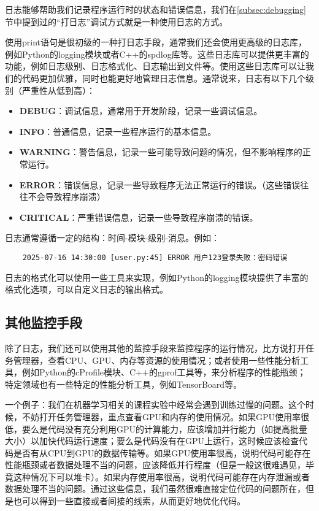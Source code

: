 \documentclass[../main.tex]{subfiles}
\begin{document}
日志能够帮助我们记录程序运行时的状态和错误信息，我们在\ref{subsec:debugging}节中提到过的“打日志”调试方式就是一种使用日志的方式。

使用print语句是很初级的一种打日志手段，通常我们还会使用更高级的日志库，例如Python的logging模块或者C++的spdlog库等。这些日志库可以提供更丰富的功能，例如日志级别、日志格式化、日志输出到文件等。使用这些日志库可以让我们的代码更加优雅，同时也能更好地管理日志信息。通常说来，日志有以下几个级别（严重性从低到高）：
\begin{itemize}
  \item \textbf{DEBUG}：调试信息，通常用于开发阶段，记录一些调试信息。
  \item \textbf{INFO}：普通信息，记录一些程序运行的基本信息。
  \item \textbf{WARNING}：警告信息，记录一些可能导致问题的情况，但不影响程序的正常运行。
  \item \textbf{ERROR}：错误信息，记录一些导致程序无法正常运行的错误。（这些错误往往不会导致程序崩溃）
  \item \textbf{CRITICAL}：严重错误信息，记录一些导致程序崩溃的错误。
\end{itemize}

日志通常遵循一定的结构：时间-模块-级别-消息。例如：
\begin{verbatim}
    2025-07-16 14:30:00 [user.py:45] ERROR 用户123登录失败：密码错误
\end{verbatim}

日志的格式化可以使用一些工具来实现，例如Python的logging模块提供了丰富的格式化选项，可以自定义日志的输出格式。

\subsection{其他监控手段}\label{subsec:other-monitoring}

除了日志，我们还可以使用其他的监控手段来监控程序的运行情况，比方说打开任务管理器，查看CPU、GPU、内存等资源的使用情况；或者使用一些性能分析工具，例如Python的cProfile模块、C++的gprof工具等，来分析程序的性能瓶颈；特定领域也有一些特定的性能分析工具，例如TensorBoard等。

一个例子：我们在机器学习相关的课程实验中经常会遇到训练过慢的问题。这个时候，不妨打开任务管理器，重点查看GPU和内存的使用情况。如果GPU使用率很低，要么是代码没有充分利用GPU的计算能力，应该增加并行能力（如提高批量大小）以加快代码运行速度；要么是代码没有在GPU上运行，这时候应该检查代码是否有从CPU到GPU的数据传输等。如果GPU使用率很高，说明代码可能存在性能瓶颈或者数据处理不当的问题，应该降低并行程度（但是一般这很难遇见，毕竟这种情况下可以堆卡）。如果内存使用率很高，说明代码可能存在内存泄漏或者数据处理不当的问题。通过这些信息，我们虽然很难直接定位代码的问题所在，但是也可以得到一些直接或者间接的线索，从而更好地优化代码。
\end{document}
